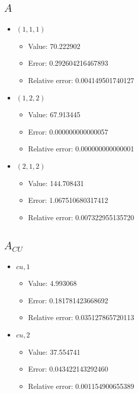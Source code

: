 \documentclass{article}%
\begin{document}
\subsection{$A$}%
\begin{itemize}%
	\item $(1, 1, 1)$%
	\begin{itemize}%
		\item Value: 70.222902%
		\item Error: 0.292604216467893%
		\item Relative error: 0.004149501740127%
	\end{itemize}%
	\item $(1, 2, 2)$%
	\begin{itemize}%
		\item Value: 67.913445%
		\item Error: 0.000000000000057%
		\item Relative error: 0.000000000000001%
	\end{itemize}%
	\item $(2, 1, 2)$%
	\begin{itemize}%
		\item Value: 144.708431%
		\item Error: 1.067510680317412%
		\item Relative error: 0.007322955135720%
	\end{itemize}%
\end{itemize}%
\subsection{$A_{CU}$}%
\begin{itemize}%
	\item $\textit{cu},1$%
	\begin{itemize}%
		\item Value: 4.993068%
		\item Error: 0.181781423668692%
		\item Relative error: 0.035127865720113%
	\end{itemize}%
	\item $\textit{cu},2$%
	\begin{itemize}%
		\item Value: 37.554741%
		\item Error: 0.043422143292460%
		\item Relative error: 0.001154900655389%
	\end{itemize}%
\end{itemize}%
\end{document}

